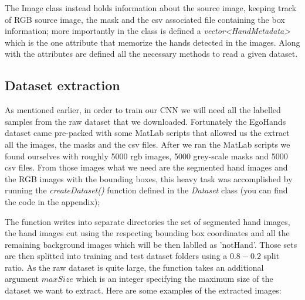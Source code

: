 The Image class instead holds information about the source image, keeping track of RGB source image, the mask and the csv associated file containing the box information;
more importantly in the class is defined a \textit{vector<HandMetadata>} which is the one attribute that memorize the hands detected in the images. Along with the attributes
are defined all the necessary methods to read a given dataset.

\subsection{Dataset extraction}
As mentioned earlier, in order to train our CNN we will need all the labelled samples from the raw dataset that we downloaded. Fortunately the EgoHands dataset came 
pre-packed with some MatLab scripts that allowed us the extract all the images, the masks and the csv files. After we ran the MatLab scripts we found ourselves with roughly 5000 
rgb images, 5000 grey-scale masks and 5000 csv files. From those images what we need are the segmented hand images and the RGB images with the bounding boxes, this heavy 
task was accomplished by running the \textit{createDataset()} function defined in the \textit{Dataset} class (you can find the code in the appendix); 

The function writes into separate directories the set of segmented hand images, the hand images cut using the respecting bounding box coordinates and all the remaining background images
which will be then lablled as 'notHand'. Those sets are then splitted into training and test dataset folders using a $0.8-0.2$ split ratio. As the raw dataset is quite large, the function takes
an additional argument $maxSize$ which is an integer specifying the maximum size of the dataset we want to extract. Here are some examples of the extracted images:

